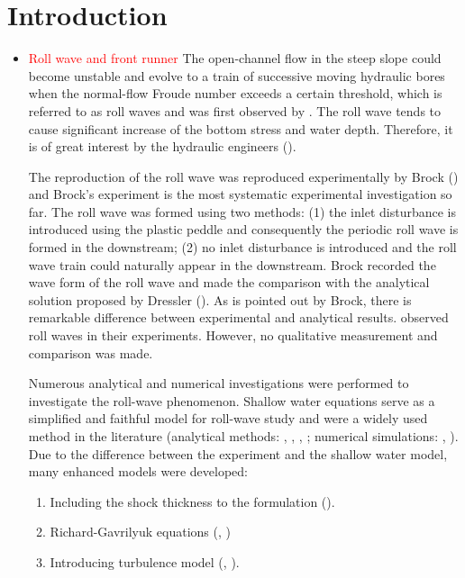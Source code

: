 \documentclass{jfm}
\begin{document}
\section{Introduction}
\label{sec:intro}
\begin{itemize}
	\item  \textcolor{Red}{Roll wave and front runner}  The open-channel flow in the steep slope could become unstable  and  evolve to a train of successive moving hydraulic bores when the normal-flow Froude number exceeds a certain threshold, which is referred to as roll waves and was first observed by \cite{Cornish1934}. The roll wave tends to cause significant increase of the bottom stress and water depth. Therefore, it is of great interest by the hydraulic engineers (\cite{Balmforth2004}). 
	
	The reproduction of the roll wave was reproduced experimentally by Brock (\cite{Brock1967}) and Brock's experiment is the most systematic experimental investigation so far. The roll wave was formed using two methods: (1) the inlet disturbance is introduced using the plastic peddle and consequently the periodic roll wave is formed in the downstream; (2) no inlet disturbance is introduced and the roll wave train could naturally appear in the downstream. Brock recorded the wave form of the roll wave and made the comparison with the analytical solution proposed by Dressler (\cite{Dressler1949}). As is pointed out by Brock, there is remarkable difference between experimental and analytical results. \cite{Liu2005} observed roll waves in their experiments. However, no qualitative measurement and comparison was made.
	
	Numerous analytical and numerical investigations were performed to investigate the roll-wave phenomenon. Shallow water equations serve as a simplified and faithful model for roll-wave study and were a widely used method in the literature (analytical methods: \cite{Dressler1949}, \cite{Needham1984}, \cite{Jeffreys1925}, \cite{Ponce1977}; numerical simulations: \cite{Zanuttigh2002}, \cite{Que2006}). Due to the difference between the experiment and the shallow water model, many enhanced models were developed:
	\begin{enumerate}
		\item Including the shock thickness to the formulation (\cite{Brock1970}).
		\item Richard-Gavrilyuk equations (\cite{Ivanova2017}, \cite{Richard2012})
		\item Introducing turbulence model (\cite{Cao2015}, \cite{Chen2021}).
	\end{enumerate}  


\end{itemize}
\end{document}
